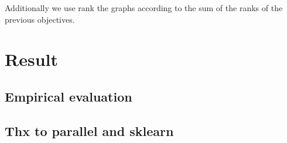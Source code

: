 \documentclass{esannV2}
\begin{document}
Additionally we use rank the graphs according to the sum of the ranks of the previous objectives.

\section{Result}

\subsection{Empirical evaluation}




\subsection*{Thx to parallel and sklearn}




\end{document}
